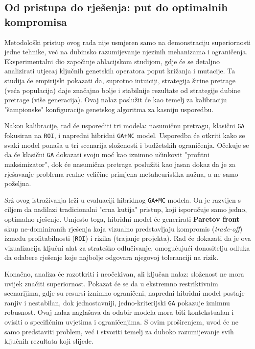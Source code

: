 \subsection{Od pristupa do rješenja: put do optimalnih kompromisa}

Metodološki pristup ovog rada nije usmjeren samo na demonstraciju superiornosti jedne tehnike, već na dubinsko razumijevanje njezinih mehanizama i ograničenja. Eksperimentalni dio započinje ablacijskom studijom, gdje će se detaljno analizirati utjecaj ključnih genetskih operatora poput križanja i mutacije. Ta studija će empirijski pokazati da, suprotno intuiciji, strategija širine pretrage (veća populacija) daje značajno bolje i stabilnije rezultate od strategije dubine pretrage (više generacija). Ovaj nalaz poslužit će kao temelj za kalibraciju "šampionske" konfiguracije genetskog algoritma za kasniju usporedbu.

Nakon kalibracije, rad će usporediti tri modela: nasumičnu pretragu, klasični \texttt{GA} fokusiran na \texttt{ROI}, i napredni hibridni \texttt{GA+MC} model. Usporedba će otkriti kako se svaki model ponaša u tri scenarija složenosti i budžetskih ograničenja. Očekuje se da će klasični \texttt{GA} dokazati svoju moć kao iznimno učinkovit "profitni maksimizator", dok će nasumična pretraga poslužiti kao jasan dokaz da je za rješavanje problema realne veličine primjena metaheuristika nužna, a ne samo poželjna.

Srž ovog istraživanja leži u evaluaciji hibridnog \texttt{GA+MC} modela. On je razvijen s ciljem da nadilazi tradicionalni "crna kutija" pristup, koji isporučuje samo jedno, optimalno rješenje. Umjesto toga, hibridni model će generirati \textbf{Paretov front} – skup ne-dominiranih rješenja koja vizualno predstavljaju kompromis (\textit{trade-off}) između profitabilnosti (\texttt{ROI}) i rizika (trajanje projekta). Rad će dokazati da je ova vizualizacija ključni alat za strateško odlučivanje, omogućujući donositelju odluka da odabere rješenje koje najbolje odgovara njegovoj toleranciji na rizik.

Konačno, analiza će razotkriti i neočekivan, ali ključan nalaz: složenost ne mora uvijek značiti superiornost. Pokazat će se da u ekstremno restriktivnim scenarijima, gdje su resursi iznimno ograničeni, napredni hibridni model postaje ranjiv i nestabilan, dok jednostavniji, jedno-kriterijski \texttt{GA} pokazuje iznimnu robusnost. Ovaj nalaz naglašava da odabir modela mora biti kontekstualan i ovisiti o specifičnim uvjetima i ograničenjima. S ovim proširenjem, uvod će ne samo predstaviti problem, već i stvoriti temelj za duboko razumijevanje svih ključnih rezultata koji slijede.

